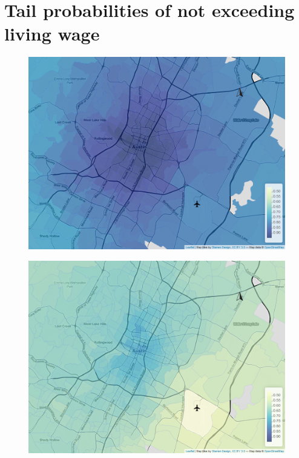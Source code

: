 \section{Tail probabilities of not exceeding living wage}
\label{appendix:maps_livingwages}

\begin{figure}[htb]
    \centering
    \begin{minipage}[t]{0.48\linewidth}
        \centering
        \includegraphics[width=\linewidth]{img/tailprob_18_56__9.png}
        \label{fig:wages:appendix1:a}
    \end{minipage}
    \begin{minipage}[t]{0.48\linewidth}
        \centering
        \includegraphics[width=\linewidth]{img/tailprob_18_56__43.png}

\end{minipage}
\end{figure}
